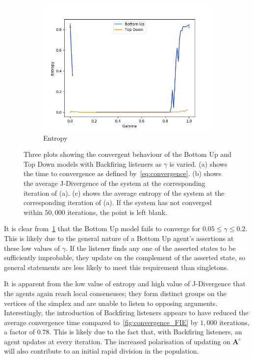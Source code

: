 \begin{figure}
\begin{subfigure}[ht]{0.45\textwidth}
    \includegraphics[width=\textwidth]{Images/Figures/BU+TD/Spiteful/Entropy.png}
    \caption{Entropy}
 \end{subfigure}
 \caption{Three plots showing the convergent behaviour of the Bottom Up and Top Down models with Backfiring listeners as $\gamma$ is varied. (a) shows the time to convergence as defined by~\cref{eq:convergence}. (b) shows the average J-Divergence of the system at the corresponding iteration of (a). (c) shows the average entropy of the system at the corresponding iteration of (a). If the system has not converged within $50,000$ iterations, the point is left blank.}\label{fig:convergence_Spite}
\end{figure}


It is clear from~\cref{fig:convergence_Spite} that the Bottom Up model fails to converge for $0.05 \leq \gamma \leq 0.2$. This is likely due to the general nature of a Bottom Up agent's assertions at these low values of $\gamma$. If the listener finds any one of the asserted states to be sufficiently improbable, they update on the complement of the asserted state, so general statements are less likely to meet this requirement than singletons.

It is apparent from the low value of entropy and high value of J-Divergence that the agents again reach local consensuses; they form distinct groups on the vertices of the simplex and are unable to listen to opposing arguments. Interestingly, the introduction of Backfiring listeners appears to have reduced the average convergence time compared to~\cref{fig:convergence_FIE} by $1,000$ iterations, a factor of $0.78$. This is likely due to the fact that, with Backfiring listeners, an agent updates at every iteration. The increased polarisation of updating on $\mathbf{A}^c$ will also contribute to an initial rapid division in the population. 


